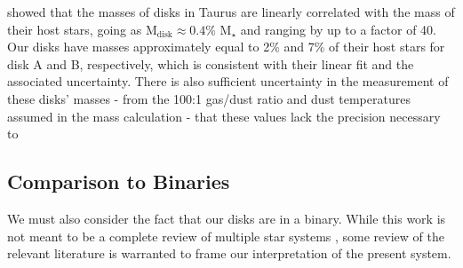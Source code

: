 \citet{Andrews2013} showed that the masses of disks in Taurus are linearly correlated with the mass of their host stars, going as M$_\text{disk} \approx 0.4$\% M$_\star$ and ranging by up to a factor of 40. Our disks have masses approximately equal to 2\% and 7\% of their host stars for disk A and B, respectively, which is consistent with their linear fit and the associated uncertainty. There is also sufficient uncertainty in the measurement of these disks' masses - from the 100:1 gas/dust ratio and dust temperatures assumed in the mass calculation - that these values lack the precision necessary to





\subsection{Comparison to Binaries}





We must also consider the fact that our disks are in a binary. While this work is not meant to be a complete review of multiple star systems \citep[for a more comprehensive review, see][]{Duchene2013}, some review of the relevant literature is warranted to frame our interpretation of the present system.

